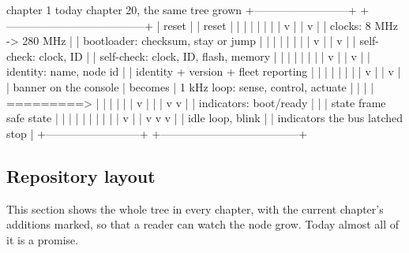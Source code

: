 \begin{asciiart}
  chapter 1 today                          chapter 20, the same tree grown
  +--------------------------+             +--------------------------------------+
  | reset                    |             | reset                                |
  |   |                      |             |   |                                  |
  |   v                      |             |   v                                  |
  | clocks: 8 MHz -> 280 MHz |             | bootloader: checksum, stay or jump    |
  |   |                      |             |   |                                  |
  |   v                      |             |   v                                  |
  | self-check: clock, ID    |             | self-check: clock, ID, flash, memory  |
  |   |                      |             |   |                                  |
  |   v                      |             |   v                                  |
  | identity: name, node id  |             | identity + version + fleet reporting  |
  |   |                      |             |   |                                  |
  |   v                      |             |   v                                  |
  | banner on the console    |  becomes    | 1 kHz loop: sense, control, actuate   |
  |   |                      | =========>  |   |            |            |         |
  |   v                      |             |   |            v            v         |
  | indicators: boot/ready   |             |   |        state frame   safe state   |
  |   |                      |             |   |            |            |         |
  |   v                      |             |   v            v            v         |
  | idle loop, blink         |             | indicators   the bus     latched stop |
  +--------------------------+             +--------------------------------------+
\end{asciiart}

\subsection*{Repository layout}

This section shows the whole tree in every chapter, with the current chapter's
additions marked, so that a reader can watch the node grow. Today almost all of
it is a promise.

